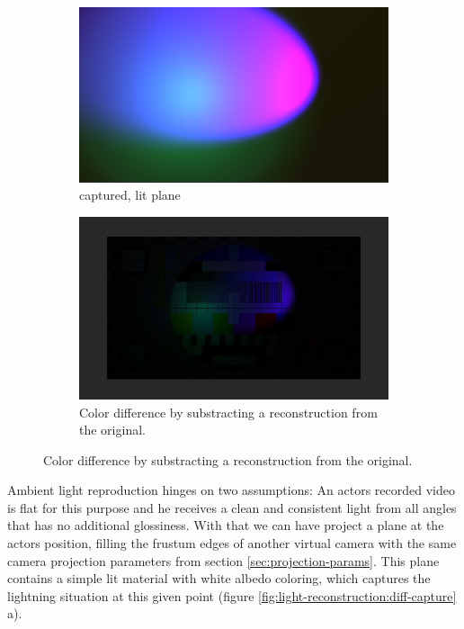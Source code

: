 \begin{figure}[htbp]
	\caption{A comparison of different composition methods in engine}
	\label{fig:light-reconstruction:diff-capture}
	\begin{subfigure}[t]{.45\textwidth}
		\centering
		\includegraphics[width=\textwidth]{_raw_resources/light-reconstruction/capture.png}
		\caption{captured, lit plane}
	\end{subfigure}
	\begin{subfigure}[t]{.45\textwidth}
		\centering
		\includegraphics[width=\textwidth]{_raw_resources/light-reconstruction/color_difference.png}
		\caption{Color difference by substracting a reconstruction from the 
			original.}
	\end{subfigure}
\end{figure}

Ambient light reproduction hinges on two assumptions: An actors recorded video 
is flat for this purpose and he receives a clean and consistent light from all 
angles that has no additional glossiness. With that we can have project a plane 
at the actors position, filling the frustum edges of another virtual camera 
with the same camera projection parameters from section 
\ref{sec:projection-params}. This plane contains a simple lit material with 
white albedo coloring, which captures the lightning situation at this given 
point (figure \ref{fig:light-reconstruction:diff-capture} a).

